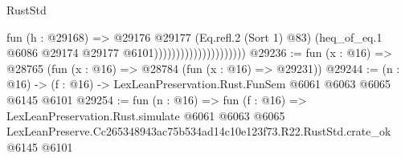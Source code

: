 \begin{lexlean}{RustStd}
\begin{coremodule}
                                          fun (h : @29168) =>
                                          @29176
                                            @29177
                                            (Eq.refl.{2} (Sort 1) @83)
                                            (heq_of_eq.{1}
                                              @6086
                                              @29174
                                              @29177
                                              @6101)))))))))))))))))))))
@29236 := fun (x : @16) => @28765 (fun (x : @16) => @28784 (fun (x : @16) => @29231))
@29244 := (n : @16) -> (f : @16) -> LexLeanPreservation.Rust.FunSem @6061 @6063 @6065 @6145 @6101
@29254 := fun (n : @16) =>
  fun (f : @16) =>
  LexLeanPreservation.Rust.simulate
    @6061
    @6063
    @6065
    LexLeanPreserve.Cc265348943ac75b534ad14c10e123f73.R22.RustStd.crate_ok
    @6145
    @6101
\end{coremodule}
\end{lexlean}
